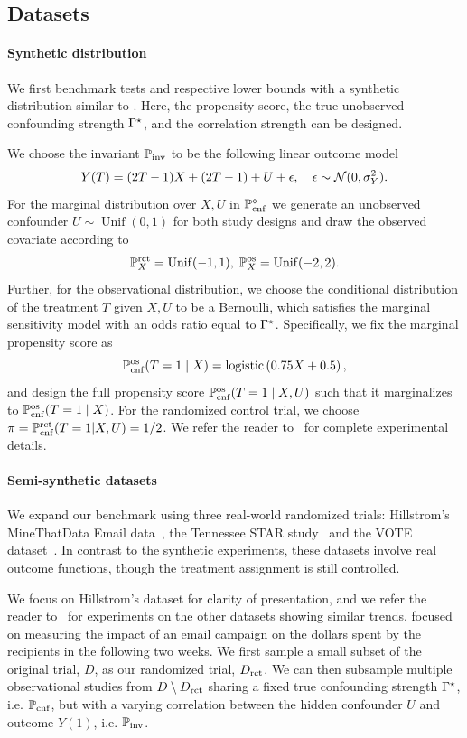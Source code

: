 \subsection{Datasets}
\label{sec:datasets}
\paragraph{Synthetic distribution} We first benchmark tests and respective lower bounds with a synthetic distribution similar to \citep{yadlowsky2022bounds,jin2023sensitivity}. Here, the propensity score, the true unobserved confounding strength $\Gamma^{\star}$, and the correlation strength can be designed.


We choose the invariant $\mathbb{P} _{\operatorname{inv}}$ to be the following linear outcome model 
$$
Y(T)= (2 T-1) X+(2 T-1) + U +\epsilon, \quad \epsilon \sim \mathcal{N}(0,\sigma^2_Y).
$$
For the marginal distribution over $X,U$ in $\mathbb{P}_{\operatorname{cnf}}^{\diamond}$ we generate an unobserved confounder $U \sim \operatorname{Unif}(0,1)$ for both study designs and draw the observed covariate according to
$$ \mathbb{P}^{\operatorname{rct}}_X = \operatorname{Unif}(-1,1), \; \mathbb{P}^{\operatorname{os}}_X =  \operatorname{Unif}(-2,2).$$
Further, for the observational distribution, we choose the conditional distribution of the treatment $T$ given $X,U$ to be a  Bernoulli, which satisfies the marginal sensitivity model with an odds ratio equal to $\Gamma^{\star}$.
Specifically, we fix the marginal propensity score as $$\mathbb{P}_{\operatorname{cnf}}^{\operatorname{os}}(T=1 \mid X)=\operatorname{logistic}\left(0.75X + 0.5\right),$$ and design the full propensity score  $\mathbb{P}_{\operatorname{cnf}}^{\operatorname{os}}(T=1 \mid X, U)$ such that it marginalizes to $\mathbb{P}_{\operatorname{cnf}}^{\operatorname{os}}(T=1 \mid X)$.
For the randomized control trial, we choose 
$\pi = \mathbb{P}^{\operatorname{rct}}_{\operatorname{cnf}} (T=1| X,U) = 1/2$.
We refer the reader to~ for complete experimental details. 






\paragraph{Semi-synthetic datasets} We expand our benchmark using three real-world randomized trials: Hillstrom's MineThatData Email data~\citep{hillstrom2008}, the Tennessee STAR study~\citep{word1990state} and the VOTE dataset~\citep{gerber2008social}.
In contrast to the synthetic experiments, these datasets involve real outcome functions, though the treatment assignment is still controlled. 

We focus on Hillstrom's dataset for clarity of presentation, and we refer the reader to~ for experiments on the other datasets showing similar trends. \citet{hillstrom2008} focused on measuring the impact of an email campaign on the dollars spent by the recipients in the following two weeks. We first sample a small subset of the original trial, $D$, as our randomized trial, $D_{\operatorname{rct}}$. We can then subsample multiple observational studies from $D \setminus D_{\operatorname{rct}}$ sharing a fixed true confounding strength $\Gamma^{\star}$, i.e. $\mathbb{P}_{\operatorname{cnf}}$, but with a varying correlation between the hidden confounder $U$ and outcome $Y(1)$, i.e. $\mathbb{P} _{\operatorname{inv}}$. 

